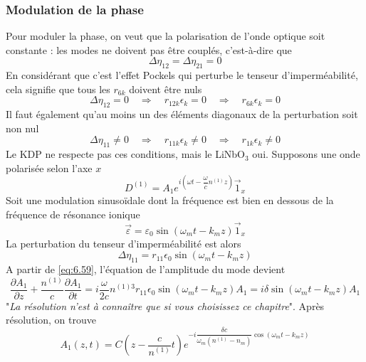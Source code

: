 \subsubsection{Modulation de la phase}
Pour moduler la phase, on veut que la polarisation de l'onde optique soit constante : les modes ne doivent pas
être couplés, c'est-à-dire que
\begin{equation}
\Delta \eta_{12}=\Delta \eta_{21}=0
\end{equation}
En considérant que c'est l'effet Pockels qui perturbe le tenseur d'imperméabilité, cela signifie que tous
les $r_{6k}$ doivent être nuls
\begin{equation}
\Delta\eta_{12}=0\quad\Rightarrow\quad r_{12k}\epsilon_k=0\quad\Rightarrow\quad r_{6k}\epsilon_k=0
\end{equation}
Il faut également qu'au moins un des éléments diagonaux de la perturbation soit non nul
\begin{equation}
\Delta \eta_{11}\neq 0 \quad\Rightarrow\quad r_{11k}\epsilon_k\neq0\quad\Rightarrow\quad r_{1k}\epsilon_k\neq0
\end{equation}
Le KDP ne respecte pas ces conditions, mais le LiNbO$_3$ oui. Supposons une onde polarisée selon l'axe $x$
\begin{equation}
D^{(1)} = A_1e^{i\left(\omega t -\dfrac{\omega}{c}n^{(1)}z\right)}\vec{1}_x
\end{equation}
Soit une modulation sinusoïdale dont la fréquence est bien en dessous de la fréquence de résonance ionique
\begin{equation}
\vec\varepsilon=\varepsilon_0\sin\left(\omega_mt-k_mz\right)\vec{1}_x
\end{equation}
La perturbation du tenseur d'imperméabilité est alors
\begin{equation}
\Delta\eta_{11} = r_{11}\epsilon_0\sin(\omega_mt-k_mz)
\end{equation}
A partir de \eqref{eq:6.59}, l'équation de l'amplitude du mode devient
\begin{equation}
\dfrac{\partial A_1}{\partial z}+\dfrac{n^{(1)}}{c}\dfrac{\partial A_1}{\partial t}=i\dfrac{\omega}{2c}
n^{(1)3}r_{11}\epsilon_0\sin(\omega_mt-k_mz)A_1=i\delta\sin(\omega_mt-k_mz)A_1
\end{equation}
"\textit{La résolution n'est à connaître que si vous choisissez ce chapitre}". Après résolution, on trouve
\begin{equation}
A_1(z,t) = C\left(z-\dfrac{c}{n^{(1)}}t\right) e^{-i\dfrac{\delta c}{\omega_m(n^{(1)}-n_m)}\cos(\omega_mt-k_mz)}
\end{equation}
